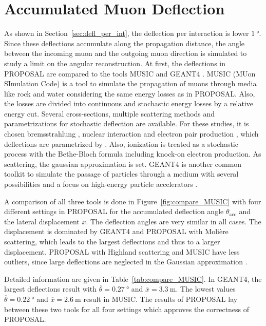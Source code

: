 \section{Accumulated Muon Deflection}\label{sec:accum_defl}

As shown in Section~\ref{sec:defl_per_int}, the deflection per interaction 
is lower $\SI{1}{\degree}$. Since these deflections accumulate along the 
propagation distance, the angle between the incoming muon and the outgoing 
muon direction is simulated to study a limit on the angular reconstruction.
At first, the deflections in PROPOSAL are compared to 
the tools MUSIC \cite{MUSIC,comparison_MUSIC_GEANT4_2009} and GEANT4 \cite{GEANT4}.
MUSIC (MUon SImulation Code) is a tool to simulate the propagation of muons 
through media like rock and water considering the same energy losses as in 
PROPOSAL. Also, the losses are divided into continuous and stochastic 
energy losses by a relative energy cut. Several cross-sections, multiple scattering 
methods and parametrizations for stochastic deflection are 
available. For these studies, it is chosen bremsstrahlung \cite{Bremsstrahlung_KKP}, 
nuclear interaction \cite{nulcint_bugaev_Shlepin, bugaev_1980_defl,bugaev_1981_defl} 
and electron pair production \cite{epair_kelner,epair_kokoulin_petrukhin}, 
which deflections are parametrized by \cite{Van_Ginneken}. 
Also, ionization is treated as a stochastic process with the Bethe-Bloch 
formula including knock-on electron production. As scattering, the gaussian 
approximation \cite{HIGHLAND_1975} is set. 
GEANT4 is another common toolkit to simulate the passage of particles through 
a medium with several possibilities and a focus on high-energy 
particle accelerators \cite{GEANT4}. 

A comparison of all three tools is done in Figure~\ref{fig:compare_MUSIC} 
with four different settings in PROPOSAL for the 
accumulated deflection angle $\theta_{\text{acc}}$ and the lateral displacement
$x$. The deflection angles are very similar in all cases. The 
displacement is dominated by GEANT4 and PROPOSAL with Molière scattering, which 
leads to the largest deflections and thus to a larger displacement. 
PROPOSAL with Highland scattering and MUSIC have less outliers, since large 
deflections are neglected in the Gaussian approximation \cite{HIGHLAND_1975}. 

Detailed information are given in Table~\ref{tab:compare_MUSIC}. In GEANT4, the 
largest deflections result with $\overline{\theta} = \SI{0.27}{\degree}$ 
and $\overline{x} = \SI{3.3}{\meter}$. The lowest values $\overline{\theta} = \SI{0.22}{\degree}$ and 
$\overline{x} = \SI{2.6}{\meter}$ result in MUSIC. The results of PROPOSAL lay between 
these two tools for all four settings which approves the 
correctness of PROPOSAL.

